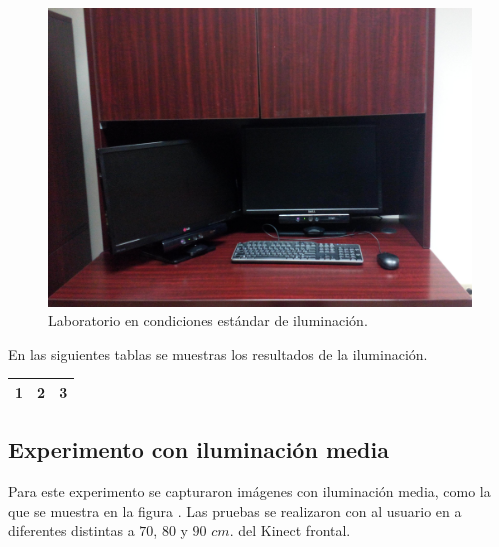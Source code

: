\begin{figure}[h!]
\begin{center} 
\includegraphics[scale=0.11]{./Figures/iluminacion.jpg}
\end{center}
\caption{Laboratorio en condiciones estándar de iluminación.}
\label{fig:LabIluminado}
\end{figure} 

En las siguientes tablas se muestras los resultados de la iluminación. 

\begin{tabular}{ | l | c | r | }
\hline
  1 & 2 & 3 \\
\hline
\end{tabular}


\subsection{Experimento con iluminación media} 
Para este experimento se capturaron imágenes con iluminación media, como la que se muestra en la figura . Las pruebas se realizaron con al usuario en a diferentes distintas a $70$, $80$ y $90$ $cm.$ del Kinect frontal. 

